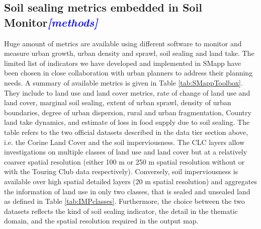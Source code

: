 \documentclass[APA,LATO1COL,doublespace]{WileyNJD-v2}
\newcommand{\update}[1]{\emph{\textcolor{blue}{#1}}}     %
\begin{document}
\subsection{Soil sealing metrics embedded in Soil Monitor\update{[methods]}}
Huge amount of metrics are available using different software to monitor and measure urban growth, urban density and sprawl, soil sealing and land take.
The limited list of indicators we have developed and implemented in SMapp have been chosen in close collaboration with urban planners to address their planning needs. 
A summary of available metrics is given in Table \ref{tab:SMappToolbox}.
They include to land use and land cover metrics, rate of change of land use and land cover, marginal soil sealing, extent of urban sprawl, density of urban boundaries, degree of urban dispersion, rural and urban fragmentation, Country land take dynamics, and estimate of loss in food supply due to soil sealing. 
The table refers to the two official datasets described in the data tier section above, i.e. the Corine Land Cover and the soil imperviousness. 
The CLC layers allow investigations on multiple classes of land use and land cover but at a relatively coarser spatial resolution (either 100 m or 250 m spatial resolution without or with the Touring Club data respectively).
Conversely, soil imperviousness is available over high spatial detailed layers (20 m spatial resolution) and aggregates the information of land use in only two classes, that is sealed and unsealed land as defined in Table \ref{tab:IMPclasses}. 
Furthermore, the choice between the two datasets reflects the kind of soil sealing indicator, the detail in the thematic domain, and the spatial resolution required in the output map. 
\end{document}
